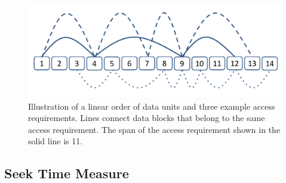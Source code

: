 \begin{figure}[t]
\centering
\includegraphics[width=\columnwidth]{AccessReqsFigure.pdf}
\caption{Illustration of a linear order of data units and three example access
requirements.  Lines connect data blocks that belong to the same access
requirement.  The span of the access requirement shown in the solid line is 11.
}
\label{singleAR}
\end{figure}



\subsection{Seek Time Measure}

